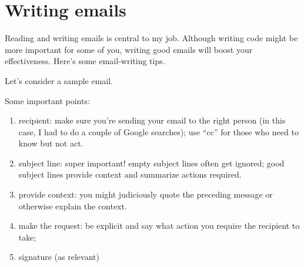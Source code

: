 \documentclass[11pt]{article}
\begin{document}
\newpage
\section*{Writing emails}
Reading and writing emails is central to my job. Although writing code might be
more important for some of you, writing good emails will boost your effectiveness.
Here's some email-writing tips.

Let's consider a sample email.

\lstset{extendedchars=true}


Some important points:
\begin{enumerate}
\item recipient: make sure you're sending your email to the right person (in this case,
  I had to do a couple of Google searches); use ``cc'' for those who need to know but not act.
\item subject line: super important! empty subject lines often get ignored; good subject lines provide context and summarize actions required.
\item provide context: you might judiciously quote the preceding message or otherwise explain the context.
\item make the request: be explicit and say what action you require the recipient to take;
\item signature (as relevant)
  
\end{enumerate}
\end{document}
